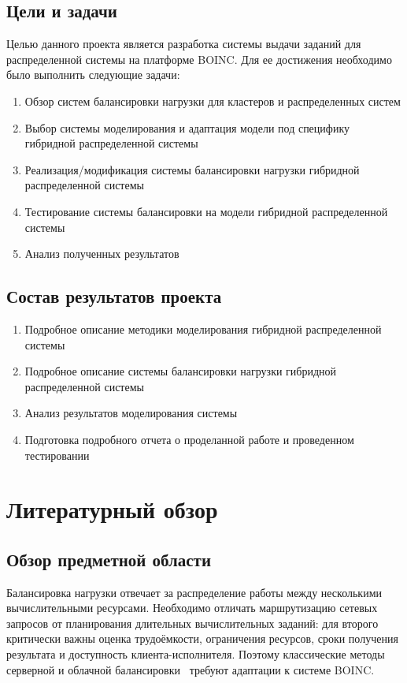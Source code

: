 \documentclass[a4paper,12pt]{extarticle}
\begin{document}
\subsection{Цели и задачи}
Целью данного проекта является разработка системы выдачи заданий для распределенной системы на платформе BOINC. Для ее достижения необходимо было выполнить следующие задачи:
\begin{enumerate}
    \item Обзор систем балансировки нагрузки для кластеров и распределенных систем
    \item Выбор системы моделирования и адаптация модели под специфику гибридной распределенной системы
    \item Реализация/модификация системы балансировки нагрузки гибридной распределенной системы
    \item Тестирование системы балансировки на модели гибридной распределенной системы
    \item Анализ полученных результатов
\end{enumerate}

\subsection{Состав результатов проекта}
\begin{enumerate}
    \item Подробное описание методики моделирования гибридной распределенной системы
    \item Подробное описание системы балансировки нагрузки гибридной распределенной системы
    \item Анализ результатов моделирования системы
    \item Подготовка подробного отчета о проделанной работе и проведенном тестировании
\end{enumerate}

\newpage
\section{Литературный обзор}
\subsection{Обзор предметной области}
Балансировка нагрузки отвечает за распределение работы между несколькими вычислительными ресурсами. Необходимо отличать маршрутизацию сетевых запросов от планирования длительных вычислительных заданий: для второго критически важны оценка трудоёмкости, ограничения ресурсов, сроки получения результата и доступность клиента-исполнителя. Поэтому классические методы серверной и облачной балансировки~\cite{srv-lb,lb-in-cloud} требуют адаптации к системе BOINC.
\end{document}
